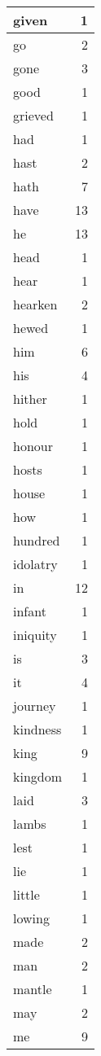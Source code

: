 \begin{center}
\begin{longtable}{l|r}
given & 1 \\ \hline
go & 2 \\ \hline
gone & 3 \\ \hline
good & 1 \\ \hline
grieved & 1 \\ \hline
had & 1 \\ \hline
hast & 2 \\ \hline
hath & 7 \\ \hline
have & 13 \\ \hline
he & 13 \\ \hline
head & 1 \\ \hline
hear & 1 \\ \hline
hearken & 2 \\ \hline
hewed & 1 \\ \hline
him & 6 \\ \hline
his & 4 \\ \hline
hither & 1 \\ \hline
hold & 1 \\ \hline
honour & 1 \\ \hline
hosts & 1 \\ \hline
house & 1 \\ \hline
how & 1 \\ \hline
hundred & 1 \\ \hline
idolatry & 1 \\ \hline
in & 12 \\ \hline
infant & 1 \\ \hline
iniquity & 1 \\ \hline
is & 3 \\ \hline
it & 4 \\ \hline
journey & 1 \\ \hline
kindness & 1 \\ \hline
king & 9 \\ \hline
kingdom & 1 \\ \hline
laid & 3 \\ \hline
lambs & 1 \\ \hline
lest & 1 \\ \hline
lie & 1 \\ \hline
little & 1 \\ \hline
lowing & 1 \\ \hline
made & 2 \\ \hline
man & 2 \\ \hline
mantle & 1 \\ \hline
may & 2 \\ \hline
me & 9 \\ \hline

\end{longtable}
\end{center}
